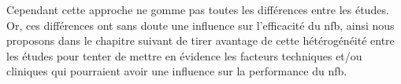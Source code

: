 Cependant cette approche ne gomme pas toutes les différences entre les études. Or, ces différences ont sans doute une influence sur l'efficacité du \gls{nfb}, ainsi nous proposons dans le chapitre 
suivant de tirer avantage de cette hétérogénéité entre les études pour tenter de mettre en évidence les facteurs 
techniques et/ou cliniques qui pourraient avoir une influence sur la performance du \gls{nfb}.

  